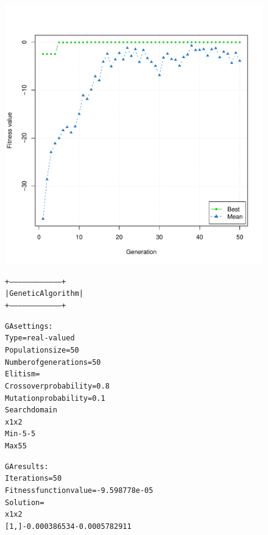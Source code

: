 \documentclass{article}
\begin{document}
\begin{figure}
	\begin{center}
		\begin{minipage}[h!]{0.66\textwidth}
			\includegraphics[width=1.0\textwidth]{gaConverge3DRasta.pdf}
		\end{minipage}
		\begin{minipage}[h!]{0.33\textwidth}
			\begin{alltt}
			+-----------------------------------+
			|         Genetic Algorithm         |
			+-----------------------------------+
			
			GA settings: 
			Type                  =  real-valued 
			Population size       =  50 
			Number of generations =  50 
			Elitism               =   
			Crossover probability =  0.8 
			Mutation probability  =  0.1 
			Search domain 
			    x1 x2
			Min -5 -5
			Max  5  5
			
			GA results: 
			Iterations             = 50 
			Fitness function value = -9.598778e-05 
			Solution               = 
			               x1            x2
			[1,] -0.000386534 -0.0005782911
			\end{alltt}	
		\end{minipage}
	\end{center}
\end{figure}
\end{document}
